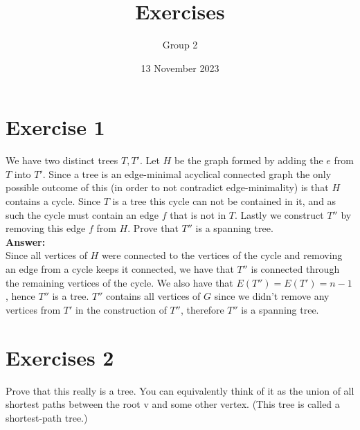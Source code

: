\documentclass[nobib]{tufte-handout}
\title{Exercises}
\author[Group 2]{Group 2}%
\date{13 November 2023}
\begin{document}
\maketitle%

\section{Exercise 1}
    We have two distinct trees $T, T'$. Let $H$ be the graph formed by adding the $e$ from $T$ into $T'$. Since a tree is an edge-minimal acyclical connected graph the only possible outcome of this (in order to not contradict edge-minimality) is that $H$ contains a cycle. Since $T$ is a tree this cycle can not be contained in it, and as such the cycle must contain an edge $f$ that is not in $T$. Lastly we construct $T''$ by removing this edge $f$ from $H$. Prove that $T''$ is a spanning tree. \\

    \textbf{Answer:} \\ 
    Since all vertices of $H$ were connected to the vertices of the cycle and removing an edge from a cycle keeps it connected, we have that $T''$ is connected through the remaining vertices of the cycle. We also have that $E(T'') = E(T') = n - 1$, hence $T''$ is a tree. $T''$ contains all vertices of $G$ since we didn't remove any vertices from $T'$ in the construction of $T''$, therefore $T''$ is a spanning tree.

\newpage

\section{Exercises 2}
  Prove that this really is a tree. You can equivalently think of it as the union of all shortest paths between the root v and some other vertex. (This tree is called a shortest-path tree.) \\
  
\end{document}
